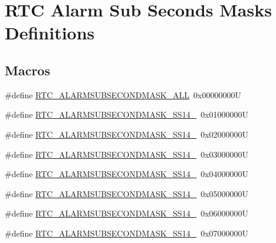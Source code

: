 \hypertarget{group___r_t_c___alarm___sub___seconds___masks___definitions}{}\section{R\+TC Alarm Sub Seconds Masks Definitions}
\label{group___r_t_c___alarm___sub___seconds___masks___definitions}
\subsection*{Macros}
\begin{DoxyCompactItemize}
\item 
\#define \hyperlink{group___r_t_c___alarm___sub___seconds___masks___definitions_gaf96ae2bcfc62e92473372c4510d517d5}{R\+T\+C\+\_\+\+A\+L\+A\+R\+M\+S\+U\+B\+S\+E\+C\+O\+N\+D\+M\+A\+S\+K\+\_\+\+A\+LL}~0x00000000U
\item 
\#define \hyperlink{group___r_t_c___alarm___sub___seconds___masks___definitions_ga382ddfaca27c4b547c69878a320aab43}{R\+T\+C\+\_\+\+A\+L\+A\+R\+M\+S\+U\+B\+S\+E\+C\+O\+N\+D\+M\+A\+S\+K\+\_\+\+S\+S14\+\_}~0x01000000U
\item 
\#define \hyperlink{group___r_t_c___alarm___sub___seconds___masks___definitions_gad627f4e6c83537e1d5b8c657f91d6bcf}{R\+T\+C\+\_\+\+A\+L\+A\+R\+M\+S\+U\+B\+S\+E\+C\+O\+N\+D\+M\+A\+S\+K\+\_\+\+S\+S14\+\_}~0x02000000U
\item 
\#define \hyperlink{group___r_t_c___alarm___sub___seconds___masks___definitions_gaeb5fb21c4ef0d54ca1515564563c0487}{R\+T\+C\+\_\+\+A\+L\+A\+R\+M\+S\+U\+B\+S\+E\+C\+O\+N\+D\+M\+A\+S\+K\+\_\+\+S\+S14\+\_}~0x03000000U
\item 
\#define \hyperlink{group___r_t_c___alarm___sub___seconds___masks___definitions_ga6f9b0a78f9723a20b1f94b5581e04194}{R\+T\+C\+\_\+\+A\+L\+A\+R\+M\+S\+U\+B\+S\+E\+C\+O\+N\+D\+M\+A\+S\+K\+\_\+\+S\+S14\+\_}~0x04000000U
\item 
\#define \hyperlink{group___r_t_c___alarm___sub___seconds___masks___definitions_gafc0252b2f8a935811dadd3d6b8ea3574}{R\+T\+C\+\_\+\+A\+L\+A\+R\+M\+S\+U\+B\+S\+E\+C\+O\+N\+D\+M\+A\+S\+K\+\_\+\+S\+S14\+\_}~0x05000000U
\item 
\#define \hyperlink{group___r_t_c___alarm___sub___seconds___masks___definitions_ga60fab8d647e6f8500926a0db2dff94d8}{R\+T\+C\+\_\+\+A\+L\+A\+R\+M\+S\+U\+B\+S\+E\+C\+O\+N\+D\+M\+A\+S\+K\+\_\+\+S\+S14\+\_}~0x06000000U
\item 
\#define \hyperlink{group___r_t_c___alarm___sub___seconds___masks___definitions_gac0f57cb99c0a40708e3dd44eafa7f8e6}{R\+T\+C\+\_\+\+A\+L\+A\+R\+M\+S\+U\+B\+S\+E\+C\+O\+N\+D\+M\+A\+S\+K\+\_\+\+S\+S14\+\_}~0x07000000U

\end{DoxyCompactItemize}
